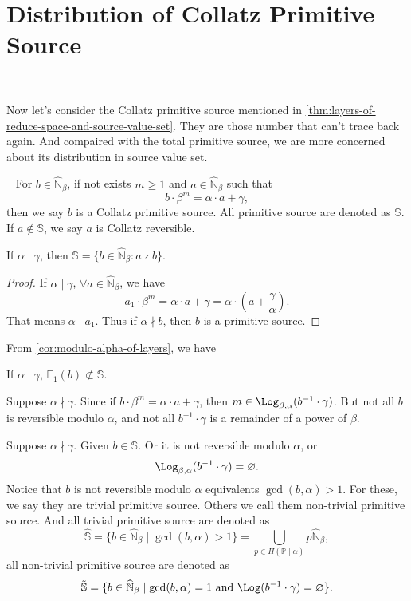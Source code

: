 \section{Distribution of Collatz Primitive Source}~\label{sec:distribution-of-collatz-primitive-source}

Now let's consider the Collatz primitive source mentioned in \cref{thm:layers-of-reduce-space-and-source-value-set}. They are those number that can't trace back again.
And compaired with the total primitive source, we are more concerned about its distribution in source value set. 

\begin{definition}~\label{def:collatz-primitive-source}
    For $b\in \widehat{\mathbb{N}}_{\beta}$, if not exists $m \ge 1$ and $a \in \widehat{\mathbb{N}}_{\beta}$ such that
    \[ b \cdot \beta^{m} = \alpha \cdot a + \gamma, \]
    then we say $b$ is a Collatz primitive source.
    All primitive source are denoted as $\mathbb{S}$.
    If $a \not\in\mathbb{S}$, we say $a$ is Collatz reversible.
\end{definition}
\begin{proposition}
    If $\alpha \mid \gamma$, then $\mathbb{S} = \{b \in \widehat{\mathbb{N}}_\beta: a\nmid b\}$.
\end{proposition}
\begin{proof}
    If $\alpha\mid \gamma$, $\forall a\in\widehat{\mathbb{N}}_\beta$, we have
    \[ a_1 \cdot \beta^{m} = \alpha \cdot a + \gamma = \alpha \cdot \left(a + \frac{\gamma}{\alpha}\right). \]
    That means $\alpha\mid a_1$. Thus if $\alpha \nmid b$, then $b$ is a primitive source.
\end{proof}
From \cref{cor:modulo-alpha-of-layers}, we have
\begin{proposition}
    If $\alpha \mid \gamma$, $\mathbb{F}_{1}(b) \not\subset \mathbb{S}$.
\end{proposition}
Suppose $\alpha \nmid \gamma$.
Since if $b \cdot \beta^m = \alpha\cdot a + \gamma$, then $m \in \Log_{\beta,\alpha}(b^{-1}\cdot\gamma)$.
But not all $b$ is reversible modulo $\alpha$, and not all $b^{-1} \cdot \gamma$ is a remainder of a power of $\beta$.
\begin{definition}
    Suppose $\alpha \nmid \gamma$. Given $b \in \mathbb{S}$. Or it is not reversible modulo $\alpha$, or
    \[\Log_{\beta, \alpha}(b^{-1} \cdot \gamma) = \varnothing. \]
    Notice that $b$ is not reversible modulo $\alpha$ equivalents $\gcd(b, \alpha) > 1$. For these, we say they are trivial primitive source.
    Others we call them non-trivial primitive source.
    And all trivial primitive source are denoted as 
    \[\hat{\mathbb{S}} = \{b \in \widehat{\mathbb{N}}_{\beta} \mid \gcd(b, \alpha) > 1\} = \bigcup_{p\in\Pi(\mathbb{P}\mid\alpha)} p\widehat{\mathbb{N}}_{{\beta}}, \]
    all non-trivial primitive source are denoted as
    \[ \tilde{\mathbb{S}} = \{b \in \widehat{\mathbb{N}}_{\beta} \mid \gcd(b, \alpha) = 1 \text{ and } \Log(b^{-1}\cdot\gamma) = \varnothing\}. \]
\end{definition}
